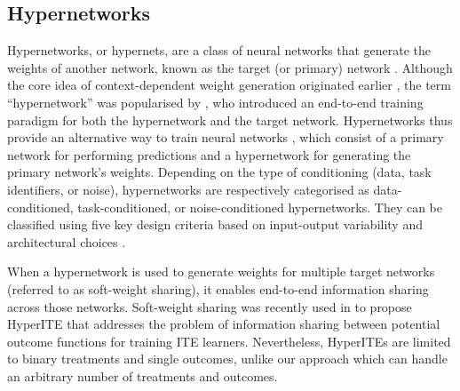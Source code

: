 


\subsection{Hypernetworks}
\label{subsec_hypernetworks}
Hypernetworks, or hypernets, are a class of neural networks that generate the weights of another network, known as the target (or primary) network \cite{chauhan2024brief}. Although the core idea of context-dependent weight generation originated earlier \cite{schmidhuber1992learning}, the term ``hypernetwork'' was popularised by \cite{ha2017hypernetworks}, who introduced an end-to-end training paradigm for both the hypernetwork and the target network. Hypernetworks thus provide an alternative way to train neural networks \cite{chauhan2024brief}, which consist of a primary network for performing predictions and a hypernetwork for generating the primary network’s weights. Depending on the type of conditioning (data, task identifiers, or noise), hypernetworks are respectively categorised as data-conditioned, task-conditioned, or noise-conditioned hypernetworks. They can be classified using five key design criteria based on input-output variability and architectural choices \cite{chauhan2024brief}.

When a hypernetwork is used to generate weights for multiple target networks (referred to as soft-weight sharing), it enables end-to-end information sharing across those networks. Soft-weight sharing was recently used in \cite{chauhan2024dynamic} to propose HyperITE that addresses the problem of information sharing between potential outcome functions for training ITE learners. Nevertheless, HyperITEs are limited to binary treatments and single outcomes, unlike our approach which can handle an arbitrary number of treatments and outcomes.


